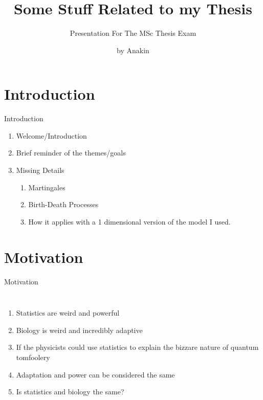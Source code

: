 \documentclass[aspectratio=169,  notheorems, sOuRcEs]{RUCPresentation}
\title{%
    Some Stuff Related to my Thesis
}
\subtitle{Presentation For The MSc Thesis Exam}
\author{by Anakin}
\newcommand\makebeamertitle{\frame{\maketitle}}%
\begin{document}
\makebeamertitle


%
%



\section{Introduction}
\begin{frame}{Introduction}

    \begin{enumerate}
        \item Welcome/Introduction
        \item Brief reminder of the themes/goals
        \item Missing Details
            \begin{enumerate}
                \item Martingales
                \item Birth-Death Processes
                \item How it applies with a 1 dimensional version of the model
                    I used.
            \end{enumerate}
    \end{enumerate}

\end{frame}


\section{ Motivation }
\begin{frame}{ Motivation }

    \begin{columns}

        \column{0.5\framewidth}

        \begin{enumerate}
            \item Statistics are weird and powerful
            \item Biology is weird and incredibly adaptive
            \item If the physicists could use statistics to explain the bizzare
                nature of quantum tomfoolery
            \item Adaptation and power can be considered the same
            \item Is statistics and biology the same?
        \end{enumerate}

        \column{0.5\framewidth}

    \end{columns}

\end{frame}
\end{document}
